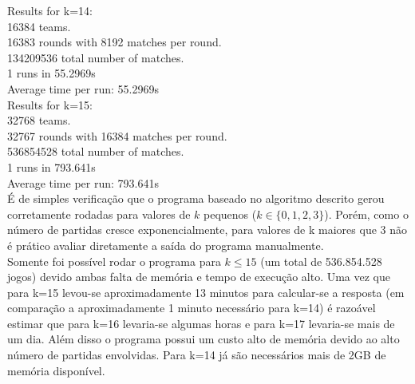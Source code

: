 \documentclass[twoside]{article}
\begin{document}
\begin{multicols}{2}
{\color[rgb]{0,0,1}Results for k=14:}\\
\hspace*{5mm}16384 teams.\\
\hspace*{5mm}16383 rounds with 8192 matches per round.\\
\hspace*{5mm}134209536 total number of matches.\\
\hspace*{5mm}1 runs in 55.2969s\\
\hspace*{5mm}Average time per run: {\color[rgb]{0.7,0.3,0}55.2969s}\\

{\color[rgb]{0,0,1}Results for k=15:}\\
\hspace*{5mm}32768 teams.\\
\hspace*{5mm}32767 rounds with 16384 matches per round.\\
\hspace*{5mm}536854528 total number of matches.\\
\hspace*{5mm}1 runs in 793.641s\\
\hspace*{5mm}Average time per run: {\color[rgb]{0.7,0.3,0}793.641s}\\

É de simples verificação que o programa baseado no algoritmo descrito gerou corretamente rodadas para valores de $k$ pequenos ($k \in \{0,1,2,3\}$). Porém, como o número de partidas cresce exponencialmente, para valores de k maiores que 3 não é prático avaliar diretamente a saída do programa manualmente.\\

Somente foi possível rodar o programa para $k \leq 15$ (um total de 536.854.528 jogos) devido ambas falta de memória e tempo de execução alto. Uma vez que para k=15 levou-se aproximadamente 13 minutos para calcular-se a resposta (em comparação a aproximadamente 1 minuto necessário para k=14) é razoável estimar que para k=16 levaria-se algumas horas e para k=17 levaria-se mais de um dia. Além disso o programa possui um custo alto de memória devido ao alto número de partidas envolvidas. Para k=14 já são necessários mais de 2GB de memória disponível.\\



\end{multicols}
\end{document}
